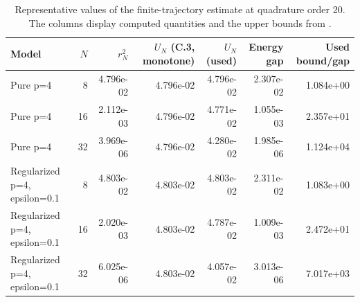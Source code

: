 \begin{table}[!htbp]
\centering\scriptsize
\caption{Representative values of the finite-trajectory estimate at quadrature order 20. The columns display computed quantities and the upper bounds from .}
\label{tab:finite-trajectory-values}
\begin{tabular}{@{}lrrrrrr@{}}
\toprule
Model & $N$ & $r_N^2$ & $U_N$ (C.3, monotone) & $U_N$ (used) & Energy gap & Used bound/gap \\ \midrule
Pure p=4 & 8 & 4.796e-02 & 4.796e-02 & 4.796e-02 & 2.307e-02 & 1.084e+00 \\
Pure p=4 & 16 & 2.112e-03 & 4.796e-02 & 4.771e-02 & 1.055e-03 & 2.357e+01 \\
Pure p=4 & 32 & 3.969e-06 & 4.796e-02 & 4.280e-02 & 1.985e-06 & 1.124e+04 \\
Regularized p=4, epsilon=0.1 & 8 & 4.803e-02 & 4.803e-02 & 4.803e-02 & 2.311e-02 & 1.083e+00 \\
Regularized p=4, epsilon=0.1 & 16 & 2.020e-03 & 4.803e-02 & 4.787e-02 & 1.009e-03 & 2.472e+01 \\
Regularized p=4, epsilon=0.1 & 32 & 6.025e-06 & 4.803e-02 & 4.057e-02 & 3.013e-06 & 7.017e+03 \\
\bottomrule
\end{tabular}
\end{table}
